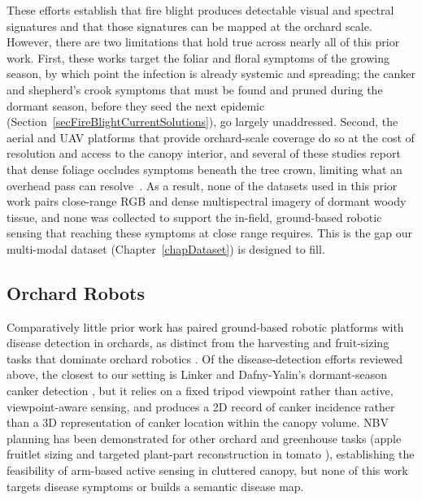 These efforts establish that fire blight produces detectable visual and
spectral signatures and that those signatures can be mapped at the orchard
scale. However, there are two limitations that hold true across nearly all of
this prior work.
First, these works target the foliar and floral symptoms of the 
growing season, by which point the infection is already systemic and 
spreading; the canker and shepherd's crook symptoms that must be found 
and pruned during the dormant season, before they seed the next epidemic
(Section~\ref{secFireBlightCurrentSolutions}), go largely unaddressed.
Second, the aerial and UAV platforms that provide orchard-scale coverage do
so at the cost of resolution and access to the canopy interior, and several of
these studies report that dense foliage occludes symptoms beneath the tree crown,
limiting what an overhead pass can
resolve~\cite{Bagheri2020AerialDetectionFireBlightPear,
Mahmud2023MaskRCNNFireBlight}.
As a result, none of the datasets used in this prior work pairs close-range
RGB and dense multispectral imagery of dormant woody tissue, and none was
collected to support the in-field, ground-based robotic sensing that reaching
these symptoms at close range requires.
This is the gap our multi-modal dataset (Chapter~\ref{chapDataset}) is
designed to fill.

\subsection{Orchard Robots} \label{secCurrentEffortsRobots}

Comparatively little prior work has paired ground-based robotic platforms with
disease detection in orchards, as distinct from the harvesting and
fruit-sizing tasks that dominate orchard robotics \cite{droukas2023survey,
Freeman2024AppleFruitletSizing}.
Of the disease-detection efforts reviewed above, the closest to our setting is
Linker and Dafny-Yalin's dormant-season canker detection
\cite{Linker2024MappingFireBlightCankersFRCNN}, but it relies on a fixed
tripod viewpoint rather than active, viewpoint-aware sensing, and produces a
2D record of canker incidence rather than a 3D representation of canker
location within the canopy volume.
NBV planning has been demonstrated for other orchard and greenhouse
tasks (apple fruitlet sizing \cite{Freeman2024AppleFruitletSizing} and
targeted plant-part reconstruction in tomato
\cite{Burusa2024AttentionDrivenNBVPlantParts,
Burusa2024SemanticsAwareNBVPlantParts}), establishing the feasibility of
arm-based active sensing in cluttered canopy, but none of this work targets
disease symptoms or builds a semantic disease map.


